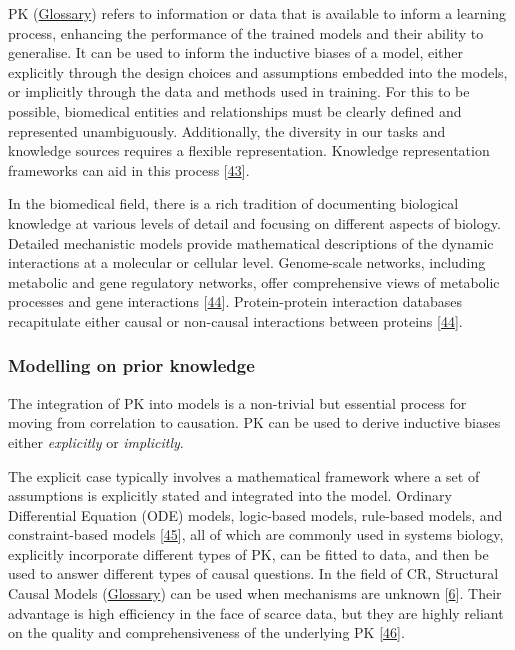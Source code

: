 PK (\protect\hyperlink{prior-knowledge-1}{Glossary}) refers to information or data that is available to inform a learning process, enhancing the performance of the trained models and their ability to generalise.
It can be used to inform the inductive biases of a model, either explicitly through the design choices and assumptions embedded into the models, or implicitly through the data and methods used in training.
For this to be possible, biomedical entities and relationships must be clearly defined and represented unambiguously.
Additionally, the diversity in our tasks and knowledge sources requires a flexible representation.
Knowledge representation frameworks can aid in this process {[}\protect\hyperlink{ref-tr1XjZ1R}{43}{]}.

In the biomedical field, there is a rich tradition of documenting biological knowledge at various levels of detail and focusing on different aspects of biology.
Detailed mechanistic models provide mathematical descriptions of the dynamic interactions at a molecular or cellular level.
Genome-scale networks, including metabolic and gene regulatory networks, offer comprehensive views of metabolic processes and gene interactions {[}\protect\hyperlink{ref-s2EFuVEM}{44}{]}.
Protein-protein interaction databases recapitulate either causal or non-causal interactions between proteins {[}\protect\hyperlink{ref-s2EFuVEM}{44}{]}.

\hypertarget{modelling-on-prior-knowledge}{%
\subsubsection{Modelling on prior knowledge}\label{modelling-on-prior-knowledge}}

The integration of PK into models is a non-trivial but essential process for moving from correlation to causation.
PK can be used to derive inductive biases either \emph{explicitly} or \emph{implicitly}.

The explicit case typically involves a mathematical framework where a set of assumptions is explicitly stated and integrated into the model.
Ordinary Differential Equation (ODE) models, logic-based models, rule-based models, and constraint-based models {[}\protect\hyperlink{ref-94lBUqNp}{45}{]}, all of which are commonly used in systems biology, explicitly incorporate different types of PK, can be fitted to data, and then be used to answer different types of causal questions.
In the field of CR, Structural Causal Models (\protect\hyperlink{structural-causal-models-scms}{Glossary}) can be used when mechanisms are unknown {[}\protect\hyperlink{ref-4Dq1NQZ8}{6}{]}.
Their advantage is high efficiency in the face of scarce data, but they are highly reliant on the quality and comprehensiveness of the underlying PK {[}\protect\hyperlink{ref-xjVh8IQ5}{46}{]}.

